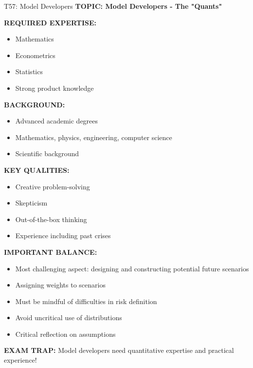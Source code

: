 \documentclass[8pt]{beamer}
\begin{document}
	\begin{frame}{T57: Model Developers}
		\fontsize{6.5}{7.5}\selectfont
		\textbf{TOPIC: Model Developers - The "Quants"}
		
		\vspace{0.1cm}
		\textbf{REQUIRED EXPERTISE:}
		\begin{itemize}
			\item Mathematics
			\item Econometrics
			\item Statistics
			\item Strong product knowledge
		\end{itemize}
		
		\vspace{0.1cm}
		\textbf{BACKGROUND:}
		\begin{itemize}
			\item Advanced academic degrees
			\item Mathematics, physics, engineering, computer science
			\item Scientific background
		\end{itemize}
		
		\vspace{0.1cm}
		\textbf{KEY QUALITIES:}
		\begin{itemize}
			\item Creative problem-solving
			\item Skepticism
			\item Out-of-the-box thinking
			\item Experience including past crises
		\end{itemize}
		
		\vspace{0.1cm}
		\textbf{IMPORTANT BALANCE:}
		\begin{itemize}
			\item Most challenging aspect: designing and constructing potential future scenarios
			\item Assigning weights to scenarios
			\item Must be mindful of difficulties in risk definition
			\item Avoid uncritical use of distributions
			\item Critical reflection on assumptions
		\end{itemize}
		
		\textcolor{myred}{\textbf{EXAM TRAP:}} Model developers need \textcolor{myblue}{quantitative expertise and practical experience}!
	\end{frame}
	
\end{document}

